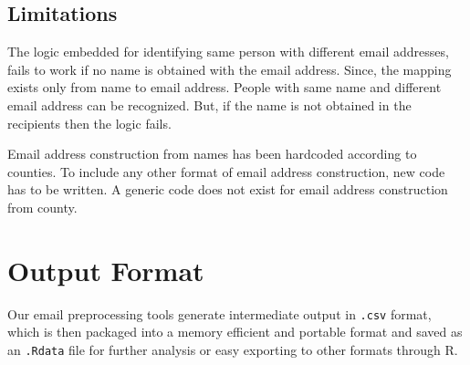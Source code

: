\documentclass[fleqn]{MJDArticle}
\begin{document}
\subsection{Limitations}
The logic embedded for identifying same person with different email addresses, fails to work if no name is obtained with the email address. Since, the mapping exists only from name to email address. People with same name and different email address can be recognized. But, if the name is not obtained in the recipients then the logic fails. 
\par 
Email address construction from names has been hardcoded according to counties. To include any other format of email address construction, new code has to be written. A generic code does not exist for email address construction from county.


\section{Output Format}


Our email preprocessing tools generate intermediate output in \texttt{.csv} format, which is then packaged into a memory efficient and portable format and saved as an \texttt{.Rdata} file for further analysis or easy exporting to other formats through R. 
\end{document}
